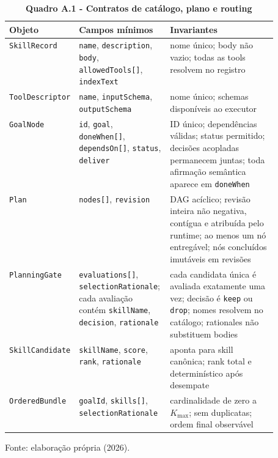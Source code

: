 \begin{table}[H]
\centering
\caption*{\textbf{Quadro A.1 - Contratos de catálogo, plano e routing}}
\scriptsize
\renewcommand{\arraystretch}{1.1}
\begin{tabularx}{\linewidth}{|>{\raggedright\arraybackslash}p{0.17\linewidth}|>{\raggedright\arraybackslash}p{0.34\linewidth}|Y|}
\hline
\textbf{Objeto} & \textbf{Campos mínimos} & \textbf{Invariantes} \\
\hline
\texttt{SkillRecord} &
\texttt{name}, \texttt{description}, \texttt{body},
\texttt{allowedTools[]}, \texttt{indexText} &
nome único; body não vazio; todas as tools resolvem no registro \\
\hline
\texttt{ToolDescriptor} &
\texttt{name}, \texttt{inputSchema}, \texttt{outputSchema} &
nome único; schemas disponíveis ao executor \\
\hline
\texttt{GoalNode} &
\texttt{id}, \texttt{goal}, \texttt{doneWhen[]}, \texttt{dependsOn[]},
\texttt{status}, \texttt{deliver} &
ID único; dependências válidas; status permitido; decisões acopladas permanecem juntas;
toda afirmação semântica aparece em \texttt{doneWhen} \\
\hline
\texttt{Plan} & \texttt{nodes[]}, \texttt{revision} &
DAG acíclico; revisão inteira não negativa, contígua e atribuída pelo runtime;
ao menos um nó entregável; nós concluídos imutáveis em revisões \\
\hline
\texttt{PlanningGate} &
\texttt{evaluations[]}, \texttt{selectionRationale}; cada avaliação contém
\texttt{skillName}, \texttt{decision}, \texttt{rationale} &
cada candidata única é avaliada exatamente uma vez; decisão é \texttt{keep} ou
\texttt{drop}; nomes resolvem no catálogo; rationales não substituem bodies \\
\hline
\texttt{SkillCandidate} &
\texttt{skillName}, \texttt{score}, \texttt{rank}, \texttt{rationale} &
aponta para skill canônica; rank total e determinístico após desempate \\
\hline
\texttt{OrderedBundle} &
\texttt{goalId}, \texttt{skills[]}, \texttt{selectionRationale} &
cardinalidade de zero a $K_{\max}$; sem duplicatas; ordem final observável \\
\hline
\end{tabularx}
\par\smallskip\raggedright\small Fonte: elaboração própria (2026).
\end{table}
